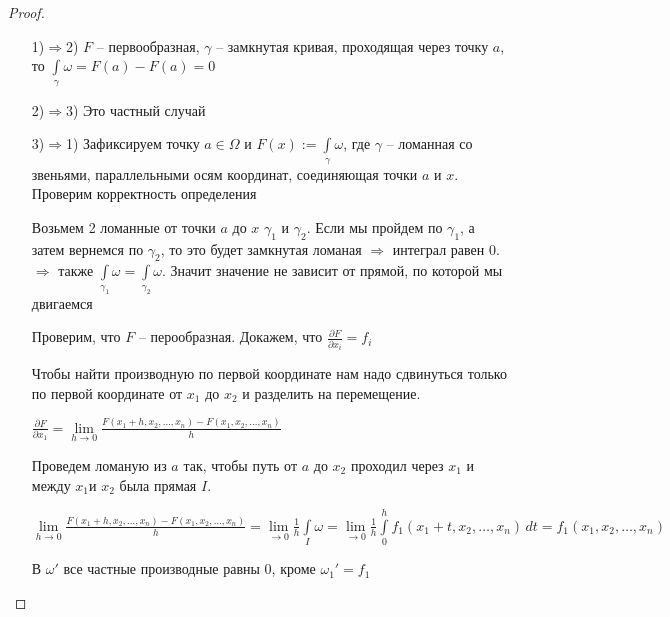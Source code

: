 \begin{proof}\thmslashn
	
	\begin{enumerate}
		\item[1)$\Rightarrow$2)] 
		$F$ -- первообразная, $\gamma$ -- замкнутая кривая, проходящая через точку $a$, то $\int\limits_\gamma \omega = F(a) - F(a) = 0$
		
		\item[2)$\Rightarrow$3)]
		Это частный случай
		
		
		\item[3)$\Rightarrow$1)]
		Зафиксируем точку $a \in \Omega$ и $F(x) := \int\limits_\gamma \omega$, где $\gamma$ -- ломанная со звеньями, параллельными осям координат, соединяющая точки $a$ и $x$. Проверим корректность определения
		
		Возьмем 2 ломанные от точки $a$ до $x$ $\gamma_1$ и $\gamma_2$. Если мы пройдем по $\gamma_1$, а затем вернемся по $\gamma_2$, то это будет замкнутая ломаная $\Rightarrow$ интеграл равен 0. $\Rightarrow$ также $\int\limits_{\gamma_1} \omega = \int\limits_{\gamma_2} \omega$. Значит значение не зависит от прямой, по которой мы двигаемся
		
		Проверим, что $F$ -- перообразная. Докажем, что $\frac{\partial F}{\partial x_i} = f_i$
		
		Чтобы найти производную по первой координате нам надо сдвинуться только по первой координате от $x_1$ до $x_2$ и разделить на перемещение.
		
		$\frac{\partial F}{\partial x_1} = \lim\limits_{h\to 0} \frac{F(x_1+h, x_2, \ldots, x_n) - F(x_1, x_2, \ldots, x_n)}{h} $
		
		Проведем ломаную из $a$ так, чтобы путь от $a$ до $x_2$ проходил через $x_1$ и между $x_1$и $x_2$ была прямая $I$.
		
		$\lim\limits_{h\to 0} \frac{F(x_1+h, x_2, \ldots, x_n) - F(x_1, x_2, \ldots, x_n)}{h} = \lim\limits_{\to 0} \frac{1}{h} \int\limits_I \omega = \lim\limits_{\to 0} \frac{1}{h} \int\limits_0^h f_1(x_1+t, x_2, \ldots, x_n) \,dt = f_1(x_1, x_2, \ldots, x_n)$
		
		В $\omega'$ все частные производные равны 0, кроме $\omega_1' = f_1$ 
		
	\end{enumerate}

\end{proof}